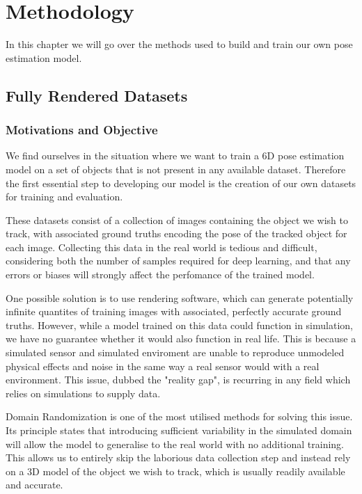 \chapter{Methodology}

In this chapter we will go over the methods used to build and train our own pose estimation model.

\section{Fully Rendered Datasets}

\subsection{Motivations and Objective}

We find ourselves in the situation where we want to train a 6D pose estimation model on a set of objects that is not present in any available dataset. Therefore the first essential step to developing our model is the creation of our own datasets for training and evaluation.

These datasets consist of a collection of images containing the object we wish to track, with associated ground truths encoding the pose of the tracked object for each image. Collecting this data in the real world is tedious and difficult, considering both the number of samples required for deep learning, and that any errors or biases will strongly affect the perfomance of the trained model. 

One possible solution is to use rendering software, which can generate potentially infinite quantites of training images with associated, perfectly accurate ground truths. However, while a model trained on this data could function in simulation, we have no guarantee whether it would also function in real life. This is because a simulated sensor and simulated enviroment are unable to reproduce unmodeled physical effects and noise in the same way a real sensor would with a real environment. This issue, dubbed the "reality gap"\cite{domainRandomization2}, is recurring in any field which relies on simulations to supply data.

Domain Randomization\cite{domainRandomization} is one of the most utilised methods for solving this issue. Its principle states that introducing sufficient variability in the simulated domain will allow the model to generalise to the real world with no additional training. This allows us to entirely skip the laborious data collection step and instead rely on a 3D model of the object we wish to track, which is usually readily available and accurate.

